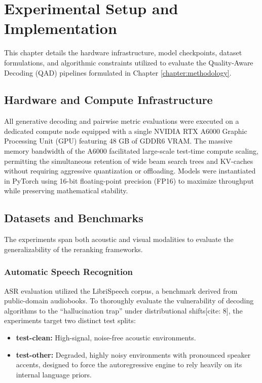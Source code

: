 \chapter{Experimental Setup and Implementation}
\label{chapter:experimental_setup}

This chapter details the hardware infrastructure, model checkpoints, dataset formulations, and algorithmic constraints utilized to evaluate the Quality-Aware Decoding (QAD) pipelines formulated in Chapter \ref{chapter:methodology}.

\section{Hardware and Compute Infrastructure}
\label{sec:hardware_setup}

All generative decoding and pairwise metric evaluations were executed on a dedicated compute node equipped with a single NVIDIA RTX A6000 Graphic Processing Unit (GPU) featuring 48 GB of GDDR6 VRAM. The massive memory bandwidth of the A6000 facilitated large-scale test-time compute scaling, permitting the simultaneous retention of wide beam search trees and KV-caches without requiring aggressive quantization or offloading. Models were instantiated in PyTorch using 16-bit floating-point precision (FP16) to maximize throughput while preserving mathematical stability.

\section{Datasets and Benchmarks}
\label{sec:datasets}

The experiments span both acoustic and visual modalities to evaluate the generalizability of the reranking frameworks.

\subsection{Automatic Speech Recognition}
ASR evaluation utilized the LibriSpeech corpus, a benchmark derived from public-domain audiobooks. To thoroughly evaluate the vulnerability of decoding algorithms to the ``hallucination trap'' under distributional shifts[cite: 8], the experiments target two distinct test splits:
\begin{itemize}
    \item \textbf{test-clean:} High-signal, noise-free acoustic environments.
    \item \textbf{test-other:} Degraded, highly noisy environments with pronounced speaker accents, designed to force the autoregressive engine to rely heavily on its internal language priors.
\end{itemize}

